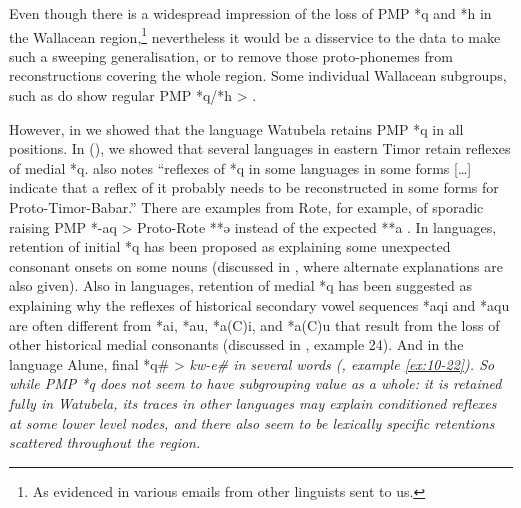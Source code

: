Even though there is a widespread impression of the loss of PMP
*q and *h in the Wallacean region,\footnote{
		As evidenced in various
		emails from other linguists sent to us.}
nevertheless it would
be a disservice to the data to make such a sweeping generalisation,
or to remove those proto-phonemes from reconstructions covering the whole region.
Some individual Wallacean subgroups,
such as  do show regular PMP *q/*h > {\0}.

However, in  we showed that the 
language Watubela retains PMP *q in all positions.
In  (), we showed that several  languages
in eastern Timor retain reflexes of medial *q.
\citet[82]{Edwards2021} also notes “reflexes of *q in some languages
in some forms [{\ldots}] indicate that a reflex of it probably
needs to be reconstructed in some forms for Proto-Timor-Babar.”
There are examples from Rote,
for example, of sporadic raising PMP *-aq > Proto-Rote **ə instead
of the expected **a \citep[151]{Edwards2021}.
In  languages, retention of initial *q has been
proposed \citep[121ff]{Collins1983} as explaining some unexpected
consonant onsets on some nouns (discussed in ,
where alternate explanations are also given).
Also in  languages,
retention of medial *q has been suggested as explaining why the
reflexes of historical secondary vowel sequences *aqi
and *aqu are often different from *ai,
*au, *a(C)i, and *a(C)u that result from the loss of other historical
medial consonants (discussed in , example 24).
And in the  language Alune,
final *q{\#} > \it{kw-e{\#}} in several words (, example \ref{ex:10-22}).
So while PMP *q does not seem to have subgrouping value as a
whole: it is retained fully in Watubela,
its traces in other languages may explain conditioned reflexes
at some lower level nodes,
and there also seem to be lexically specific retentions scattered throughout the region.

